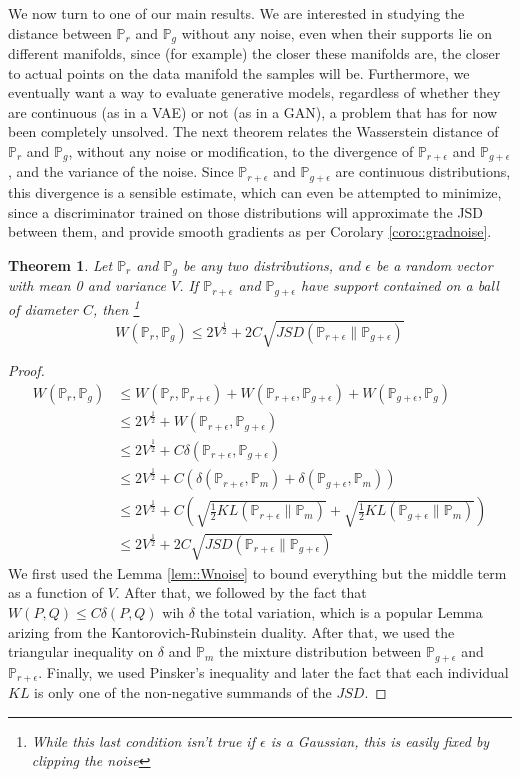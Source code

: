 \documentclass{article} %
\newcommand\PP{\mathbb{P}}
\newtheorem{theo}{Theorem}[section]
\theoremstyle{definition}
\begin{document}
We now turn to one of our main results. We are interested in studying the distance
between $\PP_r$ and $\PP_g$ without any noise, even when their supports lie on different
manifolds, since (for example) the closer these manifolds are, the closer 
to actual points on the data manifold the samples will be.
Furthermore, we eventually want a way to evaluate generative models,
regardless of whether they are continuous (as in a VAE)
or not (as in a GAN), a problem that has for now been completely unsolved. The next
theorem relates the Wasserstein distance of $\PP_r$ and $\PP_g$, without any noise
or modification, to the divergence of $\PP_{r + \epsilon}$ and $\PP_{g + \epsilon}$,
and the variance of the noise. Since $\PP_{r + \epsilon}$ and $\PP_{g + \epsilon}$ are
continuous distributions, this divergence is a sensible estimate, which can even be
attempted to minimize, since a discriminator trained on those distributions will approximate
the JSD between them, and provide smooth gradients as per Corolary \autoref{coro::gradnoise}.
\begin{theo} \label{theo::wasser}
  Let $\PP_r$ and $\PP_g$ be any two distributions, and $\epsilon$ be a random vector
with mean 0 and variance $V$. If $\PP_{r+\epsilon}$ and $\PP_{g + \epsilon}$ have
support contained on a ball of diameter $C$, then \footnote{While this last condition
isn't true if $\epsilon$ is a Gaussian, this is easily fixed by clipping the noise}
\begin{equation} \label{eq::wbound}
W(\PP_r, \PP_g) \leq 2 V^\frac{1}{2} + 2 C \sqrt{JSD(\PP_{r + \epsilon} \| \PP_{g + \epsilon})}
\end{equation}
\end{theo}
\begin{proof}
\begin{align*}
  W(\PP_r, \PP_g) &\leq W(\PP_r, \PP_{r + \epsilon}) + W(\PP_{r + \epsilon}, \PP_{g + \epsilon})
    + W(\PP_{g + \epsilon}, \PP_g) \\
  &\leq 2 V^\frac{1}{2} + W(\PP_{r + \epsilon}, \PP_{g + \epsilon}) \\
  &\leq 2 V^\frac{1}{2} + C \delta(\PP_{r + \epsilon}, \PP_{g + \epsilon}) \\
  &\leq 2 V^\frac{1}{2} + C \left( \delta(\PP_{r + \epsilon}, \PP_m) + \delta(\PP_{g + \epsilon}, \PP_m)\right) \\
  &\leq 2 V^\frac{1}{2} + C \left( \sqrt{\frac{1}{2}KL(\PP_{r + \epsilon} \| \PP_m)} + \sqrt{\frac{1}{2}KL(\PP_{g + \epsilon} \| \PP_m)} \right) \\
  &\leq 2 V^\frac{1}{2} + 2 C \sqrt{JSD(\PP_{r + \epsilon} \| \PP_{g + \epsilon})}
\end{align*}
We first used the Lemma \autoref{lem::Wnoise} to bound everything but the
middle term as a function of $V$. After that, we followed by the
fact that $W(P, Q) \leq C \delta(P, Q)$ wih $\delta$ the
total variation, which is a popular Lemma arizing from
the Kantorovich-Rubinstein duality. After that, we used the
triangular inequality on $\delta$ and $\PP_m$ the mixture distribution
between $\PP_{g + \epsilon}$ and $\PP_{r + \epsilon}$. Finally, we used
Pinsker's inequality and later the fact that each individual $KL$ is
only one of the non-negative summands of the $JSD$.
\end{proof}
\end{document}
